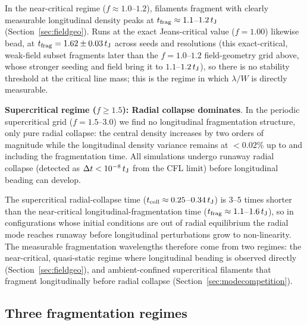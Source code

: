 \documentclass[usenatbib,twoside,twocolumn]{mnras}
\begin{document}
In the near-critical regime ($f\approx1.0$--$1.2$), filaments fragment with clearly measurable longitudinal density peaks at $t_{\rm frag}\approx1.1$--$1.2\,t_{\rm J}$ (Section~\ref{sec:fieldgeo}). Runs at the exact Jeans-critical value ($f=1.00$) likewise bead, at $t_{\rm frag}=1.62\pm0.03\,t_{\rm J}$ across seeds and resolutions (this exact-critical, weak-field subset fragments later than the $f=1.0$--$1.2$ field-geometry grid above, whose stronger seeding and field bring it to $1.1$--$1.2\,t_{\rm J}$), so there is no stability threshold at the critical line mass; this is the regime in which $\lambda/W$ is directly measurable.

\textbf{Supercritical regime ($f \geq 1.5$): Radial collapse dominates}. In the periodic supercritical grid ($f=1.5$--$3.0$) we find no longitudinal fragmentation structure, only pure radial collapse: the central density increases by two orders of magnitude while the longitudinal density variance remains at $<0.02\%$ up to and including the fragmentation time. All simulations undergo runaway radial collapse (detected as $\Delta t < 10^{-8}\,t_{\rm J}$ from the CFL limit) before longitudinal beading can develop.

The supercritical radial-collapse time ($t_{\rm coll}\approx0.25$--$0.34\,t_{\rm J}$) is $3$--$5$ times shorter than the near-critical longitudinal-fragmentation time ($t_{\rm frag}\approx1.1$--$1.6\,t_{\rm J}$), so in configurations whose initial conditions are out of radial equilibrium the radial mode reaches runaway before longitudinal perturbations grow to non-linearity. The measurable fragmentation wavelengths therefore come from two regimes: the near-critical, quasi-static regime where longitudinal beading is observed directly (Section~\ref{sec:fieldgeo}), and ambient-confined supercritical filaments that fragment longitudinally before radial collapse (Section~\ref{sec:modecompetition}).

\subsection{Three fragmentation regimes}
\end{document}

